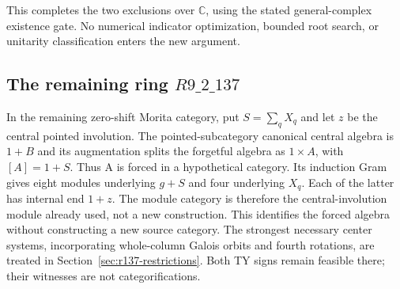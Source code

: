 This completes the two exclusions over \(\mathbb C\), using the stated
general-complex existence gate. No numerical indicator optimization,
bounded root search, or unitarity classification enters the new
argument.

\subsection{The remaining ring $R9\_2\_137$}
In the remaining zero-shift Morita category, put $S=\sum_q X_q$ and let
$z$ be the central pointed involution. The pointed-subcategory canonical
central algebra is $1+B$ and its augmentation splits the forgetful algebra
as $1\times A$, with $[A]=1+S$. Thus A is forced in a hypothetical category.
Its induction Gram gives eight modules underlying $g+S$ and four underlying
$X_q$. Each of the latter has internal end $1+z$. The module category is
therefore the central-involution module already used, not a new construction.
This identifies the forced algebra without constructing a new source category.
The strongest necessary center systems, incorporating whole-column Galois
orbits and fourth rotations, are treated in Section~\ref{sec:r137-restrictions}.
Both TY signs remain feasible there; their witnesses are not categorifications.

